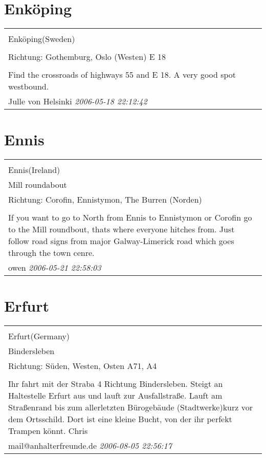 \documentclass[a4paper,12pt]{article}
\begin{document}
\section{Enköping}
\begin{tabular}{|p{13cm}|}
\hline\\
Enköping(Sweden)\\
\\
Richtung: Gothemburg, Oslo (Westen) E 18 \\
\hline\\
Find the crossroads of highways 55 and E 18. A very good spot westbound. \\
Julle von Helsinki \textit{ 2006-05-18 22:12:42 }\\\hline
\end{tabular}


\section{Ennis}
\begin{tabular}{|p{13cm}|}
\hline\\
Ennis(Ireland)\\
Mill roundabout\\
Richtung: Corofin, Ennistymon, The Burren (Norden) \\
\hline\\
If you want to go to North from Ennis to Ennistymon or Corofin go to the Mill roundbout, thats where everyone hitches from. Just follow road signs from major Galway-Limerick road which goes through the town cenre. \\
owen \textit{ 2006-05-21 22:58:03 }\\\hline
\end{tabular}


\section{Erfurt}
\begin{tabular}{|p{13cm}|}
\hline\\
Erfurt(Germany)\\
Bindersleben\\
Richtung: Süden, Westen, Osten A71, A4 \\
\hline\\
Ihr fahrt mit der Straba 4 Richtung Bindersleben. Steigt an Haltestelle Erfurt aus und lauft zur Ausfallstraße. Lauft am Straßenrand bis zum allerletzten Bürogebäude (Stadtwerke)kurz vor dem Ortsschild. Dort ist eine kleine Bucht, von der ihr perfekt Trampen könnt.
Chris \\
mail@anhalterfreunde.de \textit{ 2006-08-05 22:56:17 }\\\hline
\end{tabular}
\end{document}
